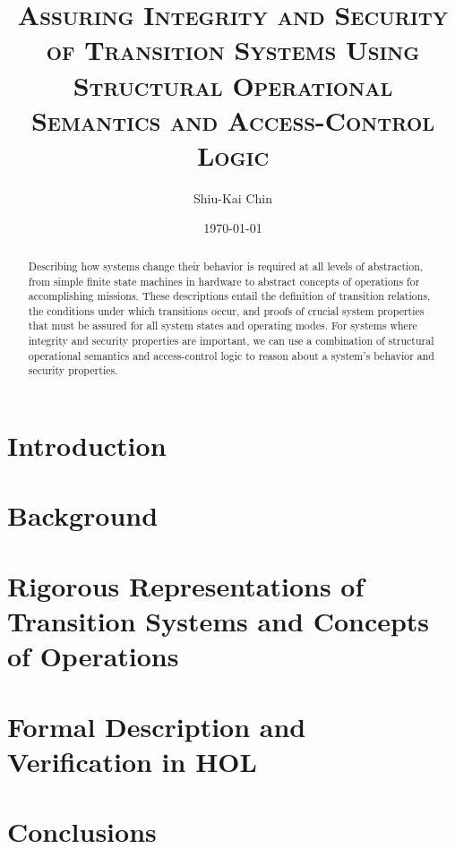 \documentclass[10pt,twoside]{article}
\title{\textsc{Assuring Integrity and Security of Transition Systems
    Using Structural Operational Semantics and Access-Control Logic}}
\author{Shiu-Kai Chin}
\date{\today{}}
\begin{document}




\maketitle
\thispagestyle{empty}
\author{}
\maketitle

\begin{abstract}
  Describing how systems change their behavior is required at all
  levels of abstraction, from simple finite state machines in hardware
  to abstract concepts of operations for accomplishing missions. These
  descriptions entail the definition of transition relations, the
  conditions under which transitions occur, and proofs of crucial
  system properties that must be assured for all system states and
  operating modes. For systems where integrity and security properties
  are important, we can use a combination of structural operational
  semantics and access-control logic to reason about a system's
  behavior and security properties.
\end{abstract}

\section{Introduction}
\label{sec:introduction}

\section{Background}
\label{sec:background}

\section{Rigorous Representations of Transition Systems and Concepts of Operations}
\label{sec:conops}

\section{Formal Description and Verification in HOL}
\label{sec:hol}

\section{Conclusions}
\label{sec:conclusions}
\end{document}

